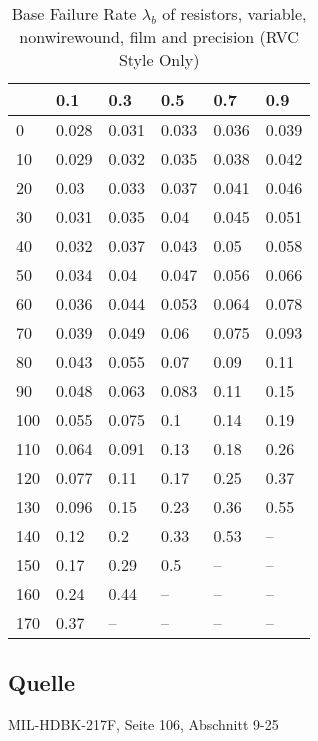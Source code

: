 \begin{table}[ht]
\begin{minipage}[t]{0.49\textwidth}
{\begin{tabular}{|p{1.05cm}|*{5}{p{1.1cm}|}}
    & 0.1 & 0.3 & 0.5 & 0.7 & 0.9 \\
    \hline
    0 & 0.028 & 0.031 & 0.033 & 0.036 & 0.039 \\
    \hline
    10 & 0.029 & 0.032 & 0.035 & 0.038 & 0.042 \\
    \hline
    20 & 0.03 & 0.033 & 0.037 & 0.041 & 0.046 \\
    \hline
    30 & 0.031 & 0.035 & 0.04 & 0.045 & 0.051 \\
    \hline
    40 & 0.032 & 0.037 & 0.043 & 0.05 & 0.058 \\
    \hline
    50 & 0.034 & 0.04 & 0.047 & 0.056 & 0.066 \\
    \hline
    60 & 0.036 & 0.044 & 0.053 & 0.064 & 0.078 \\
    \hline
    70 & 0.039 & 0.049 & 0.06 & 0.075 & 0.093 \\
    \hline
    80 & 0.043 & 0.055 & 0.07 & 0.09 & 0.11 \\
    \hline
    90 & 0.048 & 0.063 & 0.083 & 0.11 & 0.15 \\
    \hline
    100 & 0.055 & 0.075 & 0.1 & 0.14 & 0.19 \\
    \hline
    110 & 0.064 & 0.091 & 0.13 & 0.18 & 0.26 \\
    \hline
    120 & 0.077 & 0.11 & 0.17 & 0.25 & 0.37 \\
    \hline
    130 & 0.096 & 0.15 & 0.23 & 0.36 & 0.55 \\
    \hline
    140 & 0.12 & 0.2 & 0.33 & 0.53 & -- \\
    \hline
    150 & 0.17 & 0.29 & 0.5 & -- & -- \\
    \hline
    160 & 0.24 & 0.44 & -- & -- & -- \\
    \hline
    170 & 0.37 & -- & -- & -- & -- \\
    \hline
\end{tabular}
\caption{Base Failure Rate $\lambda_b$ of resistors, variable, nonwirewound, film and precision (RVC Style Only)}
\label{tab:bfr_resistors_variable_nonwirewound_film_and_precision_RVC}
\par}
\end{minipage}
\end{table}
\subsection*{Quelle}
MIL-HDBK-217F, Seite 106, Abschnitt 9-25
\restoregeometry